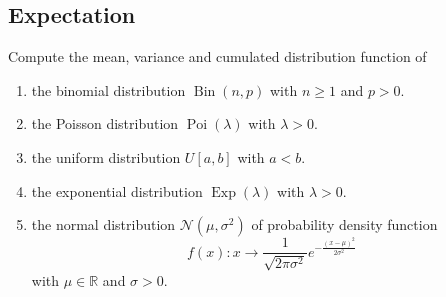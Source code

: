 \begin{center}
  \section*{Expectation}
\end{center}

\begin{Exercise}
  Compute the mean, variance and cumulated distribution function of
  \vspace*{0.2cm}

  \begin{enumerate}
    \item the binomial distribution $\operatorname{Bin}(n, p)$ with $n \geq 1$ and $p>0$.

    \item the Poisson distribution $\operatorname{Poi}(\lambda)$ with $\lambda>0$.

    \item the uniform distribution $U[a, b]$ with $a<b$.

    \item the exponential distribution $\operatorname{Exp}(\lambda)$ with $\lambda>0$.

    \item the normal distribution $\mathcal{N}\left(\mu, \sigma^{2}\right)$ of probability density function
          \[
            f(x) : x \to \frac{1}{\sqrt{2\pi \sigma^2}} e^{- \frac{{(x-\mu)}^2}{2 \sigma^2}}
          \]
          with $\mu \in \mathbb{R}$ and $\sigma>0$.

  \end{enumerate}
\end{Exercise}

